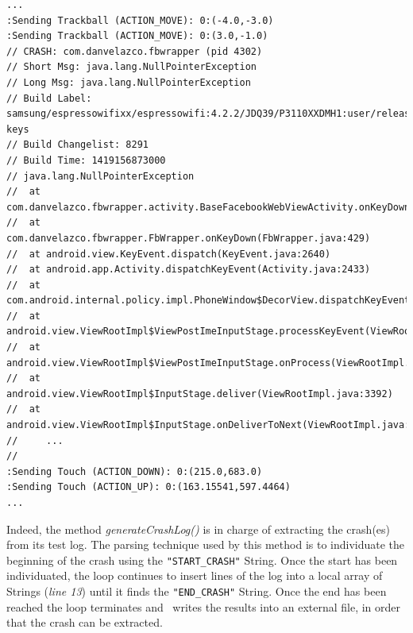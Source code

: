 \begin{lstlisting}[caption=Crash log of com.danvelazco.fbwrapper illustrated within its test log, basicstyle=\fontsize{6}{8}\ttfamily,label={lst:crashlog}]
...
:Sending Trackball (ACTION_MOVE): 0:(-4.0,-3.0)
:Sending Trackball (ACTION_MOVE): 0:(3.0,-1.0)
// CRASH: com.danvelazco.fbwrapper (pid 4302)
// Short Msg: java.lang.NullPointerException
// Long Msg: java.lang.NullPointerException
// Build Label: samsung/espressowifixx/espressowifi:4.2.2/JDQ39/P3110XXDMH1:user/release-keys
// Build Changelist: 8291
// Build Time: 1419156873000
// java.lang.NullPointerException
// 	at com.danvelazco.fbwrapper.activity.BaseFacebookWebViewActivity.onKeyDown(BaseFacebookWebViewActivity.java:649)
// 	at com.danvelazco.fbwrapper.FbWrapper.onKeyDown(FbWrapper.java:429)
// 	at android.view.KeyEvent.dispatch(KeyEvent.java:2640)
// 	at android.app.Activity.dispatchKeyEvent(Activity.java:2433)
// 	at com.android.internal.policy.impl.PhoneWindow$DecorView.dispatchKeyEvent(PhoneWindow.java:2021)
// 	at android.view.ViewRootImpl$ViewPostImeInputStage.processKeyEvent(ViewRootImpl.java:3845)
// 	at android.view.ViewRootImpl$ViewPostImeInputStage.onProcess(ViewRootImpl.java:3819)
// 	at android.view.ViewRootImpl$InputStage.deliver(ViewRootImpl.java:3392)
// 	at android.view.ViewRootImpl$InputStage.onDeliverToNext(ViewRootImpl.java:3442)
//     ...
//
:Sending Touch (ACTION_DOWN): 0:(215.0,683.0)
:Sending Touch (ACTION_UP): 0:(163.15541,597.4464)
...

\end{lstlisting} 
Indeed, the method \textit{generateCrashLog()} 
is in charge of extracting the crash(es) from its test log. The parsing technique used by this method is to individuate the beginning of the crash using the \texttt{"START\_CRASH"}  String. Once the start has been individuated, the loop continues to insert lines of the log	into a local array of Strings (\textit{line 13}) until it finds the \texttt{"END\_CRASH"} String. Once the end has been reached the loop terminates and \Cmd\ writes the results into an external file, in order that the crash can be extracted. 

